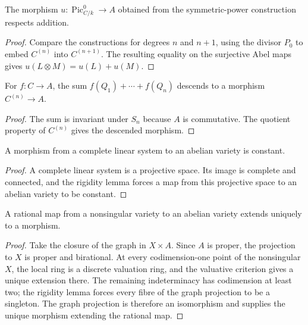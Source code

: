 \begin{lemma}
  \label{pa-lem-abel-factor-homomorphism}
  \cite{milne-av}
  The morphism \(u:\operatorname{Pic}^0_{C/k}\to A\) obtained from the
  symmetric-power construction respects addition.
\end{lemma}

\begin{proof}
  Compare the constructions for degrees \(n\) and \(n+1\), using the divisor
  \(P_0\) to embed \(C^{(n)}\) into \(C^{(n+1)}\).  The resulting equality on
  the surjective Abel maps gives \(u(L\otimes M)=u(L)+u(M)\).
\end{proof}

\begin{lemma}
  \label{pa-lem-symmetric-sum}
  \cite{milne-av}
  For \(f:C\to A\), the sum \(f(Q_1)+\cdots+f(Q_n)\) descends to a morphism
  \(C^{(n)}\to A\).
\end{lemma}

\begin{proof}
  The sum is invariant under \(S_n\) because \(A\) is commutative.  The
  quotient property of \(C^{(n)}\) gives the descended morphism.
\end{proof}

\begin{lemma}
  \label{pa-lem-linear-system-constant}
  \cite{milne-av}
  A morphism from a complete linear system to an abelian variety is constant.
\end{lemma}

\begin{proof}
  A complete linear system is a projective space.  Its image is complete and
  connected, and the rigidity lemma forces a map from this projective space to
  an abelian variety to be constant.
\end{proof}

\begin{theorem}
  \label{pa-thm-rational-extension}
  \cite[Thms.~3.1--3.2]{milne-av}
  A rational map from a nonsingular variety to an abelian variety extends
  uniquely to a morphism.
\end{theorem}

\begin{proof}
  Take the closure of the graph in \(X\times A\).  Since \(A\) is proper, the
  projection to \(X\) is proper and birational.  At every codimension-one
  point of the nonsingular \(X\), the local ring is a discrete valuation ring,
  and the valuative criterion gives a unique extension there.  The remaining
  indeterminacy has codimension at least two; the rigidity lemma forces every
  fibre of the graph projection to be a singleton.  The graph projection is
  therefore an isomorphism and supplies the unique morphism extending the
  rational map.
\end{proof}

